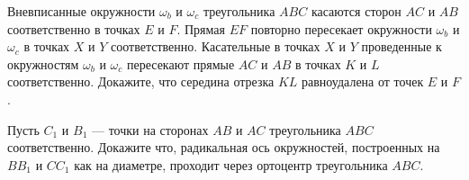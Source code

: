 \begin{tasks}
                \moditem{*} Вневписанные окружности $\omega_b$ и $\omega_c$ треугольника $ABC$ касаются сторон $AC$ и $AB$ соответственно в точках $E$ и $F$. Прямая $EF$ повторно пересекает окружности $\omega_b$ и $\omega_c$ в точках $X$ и $Y$ соответственно. Касательные в точках $X$ и $Y$ проведенные к окружностям $\omega_b$ и $\omega_c$ пересекают прямые $AC$ и $AB$ в точках $K$ и $L$ соответственно. Докажите, что середина отрезка $KL$ равноудалена от точек $E$ и $F$.


                \item \begin{tasks}
                    \item\label{lem:Hinradicalaxis}Пусть $C_1$ и $B_1$  --- точки на сторонах $AB$ и $AC$ треугольника $ABC$ соответственно. Докажите что, радикальная ось окружностей, построенных на $BB_1$ и $CC_1$ как на диаметре, проходит через ортоцентр треугольника $ABC$. 



\end{tasks}
\end{tasks}
